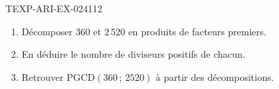 \begin{exercice}{TEXP-ARI-EX-024}{1}{12}
\begin{enumerate}
  \item Décomposer $360$ et $2\,520$ en produits de facteurs premiers.
  \item En déduire le nombre de diviseurs positifs de chacun.
  \item Retrouver $\mathrm{PGCD}(360\,;\,2520)$ à partir des décompositions.
\end{enumerate}
\end{exercice}
